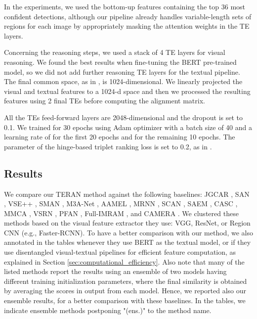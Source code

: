 \documentclass[acmsmall]{acmart}
\newcommand{\majorrevised}[1]{#1}
\begin{document}
In the experiments, we used the bottom-up features containing the top 36 most confident detections, although our pipeline already handles variable-length sets of regions for each image by appropriately masking the attention weights in the TE layers.

Concerning the reasoning steps, we used a stack of 4 TE layers for visual reasoning. We found the best results when fine-tuning the BERT pre-trained model, so we did not add further reasoning TE layers for the textual pipeline.
The final common space, as in \cite{vsepp2018faghri}, is 1024-dimensional. We linearly projected the visual and textual features to a 1024-d space and then we processed the resulting features using 2 final TEs before computing the alignment matrix.


All the TEs feed-forward layers are 2048-dimensional and the dropout is set to 0.1.
We trained for 30 epochs using Adam optimizer with a batch size of 40 and a learning rate of  for the first 20 epochs and  for the remaining 10 epochs.
The  parameter of the hinge-based triplet ranking loss is set to 0.2, as in \cite{vsepp2018faghri,li2019}.



\subsection{Results}
\majorrevised{We compare our TERAN method against the following baselines: JGCAR \cite{wang2018joint}, SAN \cite{ji2019saliency}, VSE++ \cite{vsepp2018faghri}, SMAN \cite{ji2020sman}, M3A-Net \cite{ji2020multi}, AAMEL \cite{wei2020adversarial}, MRNN \cite{karpathy2015alignment}, SCAN \cite{lee2018stackedcrossattention}, SAEM \cite{wu2019learning}, CASC \cite{xu2020cross}, MMCA \cite{wei2020multi}, VSRN \cite{li2019}, PFAN \cite{wang2019position}, Full-IMRAM \cite{Chen2020imram}, and CAMERA \cite{qu2020context}.
We clustered these methods based on the visual feature extractor they use: VGG, ResNet, or Region CNN (e.g., Faster-RCNN). To have a better comparison with our method, we also annotated in the tables whenever they use BERT as the textual model, or if they use disentangled visual-textual pipelines for efficient feature computation, as explained in Section \ref{sec:computational_efficiency}.
Also note that many of the listed methods report the results using an ensemble of two models having different training initialization parameters, where the final similarity is obtained by averaging the scores in output from each model. Hence, we reported also our ensemble results, for a better comparison with these baselines. In the tables, we indicate ensemble methods postponing "(ens.)" to the method name.
}
\end{document}

